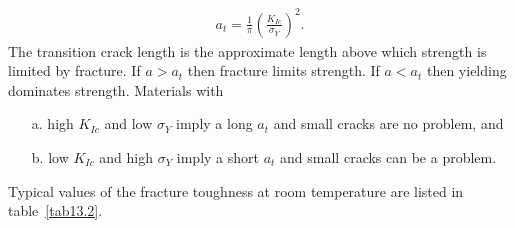 \documentclass{AeroStructure-ERJohnson}
\begin{document}

\vspace*{-1.8pc}

\begin{align}\label{eq13.15}
a_{t}=\frac{1}{\pi}\left(\frac{K_{I c}}{\sigma_{Y}}\right)^{2}.
\end{align}
The transition crack length is the approximate length above which strength is limited by fracture. If $a>a_{t}$ then fracture limits strength. If $a<a_{t}$ then yielding dominates strength. Materials with
\begin{enumerate}
\item[a.] high $K_{I c}$ and low $\sigma_{Y}$ imply a long $a_{t}$ and small cracks are no problem, and
\item[b.] low $K_{I c}$ and high $\sigma_{Y}$ imply a short $a_{t}$ and small cracks can be a problem.
\end{enumerate}


Typical values of the fracture toughness at room temperature are listed in table~\ref{tab13.2}.
\end{document}
